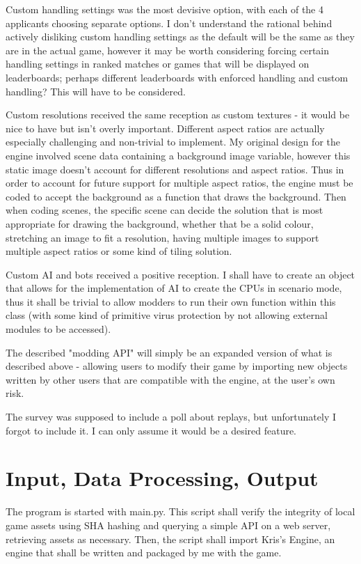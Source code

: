 \documentclass{report}
\begin{document}
Custom handling settings was the most devisive option, with each of the 4 applicants choosing separate options. I don't understand the rational behind actively disliking custom handling settings as the default will be the same as they are in the actual game, however it may be worth considering forcing certain handling settings in ranked matches or games that will be displayed on leaderboards; perhaps different leaderboards with enforced handling and custom handling? This will have to be considered.

Custom resolutions received the same reception as custom textures - it would be nice to have but isn't overly important. Different aspect ratios are actually especially challenging and non-trivial to implement. My original design for the engine involved scene data containing a background image variable, however this static image doesn't account for different resolutions and aspect ratios. Thus in order to account for future support for multiple aspect ratios, the engine must be coded to accept the background as a function that draws the background. Then when coding scenes, the specific scene can decide the solution that is most appropriate for drawing the background, whether that be a solid colour, stretching an image to fit a resolution, having multiple images to support multiple aspect ratios or some kind of tiling solution.

Custom AI and bots received a positive reception. I shall have to create an object that allows for the implementation of AI to create the CPUs in scenario mode, thus it shall be trivial to allow modders to run their own function within this class (with some kind of primitive virus protection by not allowing external modules to be accessed).

The described "modding API" will simply be an expanded version of what is described above - allowing users to modify their game by importing new objects written by other users that are compatible with the engine, at the user's own risk.

The survey was supposed to include a poll about replays, but unfortunately I forgot to include it. I can only assume it would be a desired feature.

\section{Input, Data Processing, Output}

The program is started with main.py. This script shall verify the integrity of local game assets using SHA hashing and querying a simple API on a web server, retrieving assets as necessary. Then, the script shall import Kris's Engine, an engine that shall be written and packaged by me with the game. 
\end{document}
